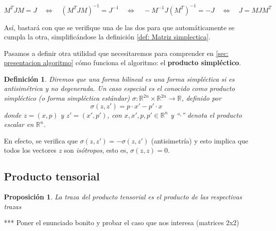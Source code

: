 \documentclass[11pt,a4paper,twoside,pdf]{article}
\numberwithin{equation}{section}
\newtheorem{definition}{Definición}
\newtheorem{proposition}{Proposición}
\begin{document}
			\begin{center}
				$M^TJM=J \quad \Leftrightarrow \quad (M^TJM)^{-1} = J^{-1}  \quad  \Leftrightarrow \quad
					-M^{-1}J(M^T)^{-1} = -J \quad \Leftrightarrow \quad  J = MJM^T $
			\end{center}

		\noindent Así, bastará con que se verifique una de las dos para que automáticamente se cumpla la otra, simplificándose la definición \ref{def: Matriz simplectica}.

		Pasamos a definir otra utilidad que necesitaremos para comprender en \ref{sec: presentacion algoritmo} cómo funciona el algoritmo: el \textbf{producto simpléctico}.
		
			\begin{definition} \label{def: producto simplectico}
				Diremos que una forma bilineal es una forma simpléctica si es antisimétrica y no degenerada. Un caso especial es el conocido como producto simpléctico (o forma simpléctica estándar) $\sigma : \mathbb{R}^{2n} \times \mathbb{R}^{2n} \longrightarrow \mathbb{R}$, definido por
					\begin{equation} \label{eq: producto simplectico}
						\sigma (z,z') = p\cdot x' - p'\cdot x
					\end{equation}
				donde $z=(x,p)$ y $z'=(x',p')$, con $x, x', p, p' \in \mathbb{R}^n$	 y ``$ \cdot$'' denota el producto escalar en $\mathbb{R}^n$.
			\end{definition}	

		En efecto, se verifica que $\sigma(z,z')=-\sigma(z,z')$ (antisimetría) y esto implica que todos los vectores $z$ son \textit{isótropos}, esto es, $\sigma(z,z)=0$.
		
		\subsection{Producto tensorial}
			
			\begin{proposition} \label{prop: traza del producto}
				La traza del producto tensorial es el producto de las respectivas trazas
			\end{proposition}	
		*** Poner el enunciado bonito y probar el caso que nos interesa (matrices 2x2)
	
\end{document}
